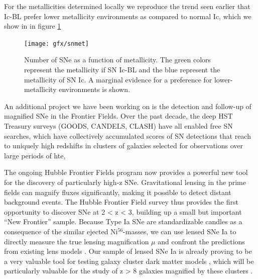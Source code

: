 For the metallicities determined locally we reproduce the trend seen earlier that Ic-BL prefer lower metallicity environments as compared to normal Ic, which we show in in figure \ref{fig:intro:snmet}

\begin{figure}[htb]
	\texttt{[image: gfx/snmet]}
	\caption{Number of SNe as a function of metallicity. The green colors represent the metallicity if SN Ic-BL and the blue represent the metallicity of SN Ic. A marginal evidence for a preference for lower-metallicity environments is shown.}
	\label{fig:intro:snmet}
\end{figure}




An additional project we have been working on is the detection and follow-up of magnified SNe in the Frontier Fields.
Over the past decade, the deep HST Treasury surveys (GOODS, CANDELS, CLASH) have
all enabled free SN searches, which have collectively
accumulated scores of SN detections that reach to uniquely high redshifts
\citep{Riess2007, Rodney2014b, Graur2014} in clusters of galaxies selected for observations over large periods of hte,

The ongoing Hubble Frontier Fields program now provides a powerful new tool for the discovery of
particularly high-z SNe. Gravitational lensing in the prime fields can
magnify fluxes significantly, making it possible to detect distant background
events. 
The Hubble Frontier Field survey thus provides the first opportunity to discover
SNe at 2 < z < 3, building up a small but important “New Frontier” sample.
Because Type Ia SNe are standardizable candles as a consequence of the similar ejected Ni$^{56}$-masses, we can use lensed SNe Ia to
directly measure the true lensing magnification $\mu$ and confront the
predictions from existing lens models \citep[e.g.][]{Riehm2011, Li2012,
Patel2014}. Our sample of lensed SNe Ia is already proving
to be a very valuable tool for testing galaxy cluster dark matter models \citep{Rodney2015}, which
will be particularly valuable for the study of z > 8 galaxies magnified by these
clusters \citep[e.g.][]{Zheng2012}.



